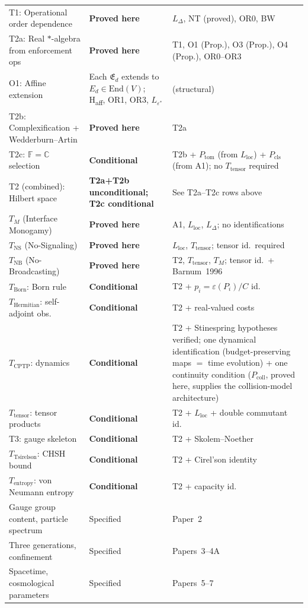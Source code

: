 \documentclass[11pt]{article}
\theoremstyle{remark}
\begin{document}
\begin{center}
\begin{tabular}{p{5.0cm}p{2.8cm}p{4.8cm}}
T1: Operational order dependence & \textbf{Proved here} & $L_\Delta$, NT (proved), OR0, BW \\
T2a: Real $*$-algebra from enforcement ops & \textbf{Proved here} & T1, O1 (Prop.), O3 (Prop.), O4 (Prop.), OR0--OR3 \\
O1: Affine extension & Each $\mathfrak{E}_d$ extends to $E_d \in \mathrm{End}(V)$; H\textsubscript{aff}, OR1, OR3, $L_{\varepsilon^*}$ & (structural) \\
T2b: Complexification + Wedderburn--Artin & \textbf{Proved here} & T2a \\
T2c: $\mathbb{F} = \mathbb{C}$ selection & \textbf{Conditional} & T2b + $P_{\mathrm{tom}}$ (from $L_{\mathrm{loc}}$) + $P_{\mathrm{cls}}$ (from A1); no $T_{\mathrm{tensor}}$ required \\
T2 (combined): Hilbert space & \textbf{T2a+T2b unconditional; T2c conditional} & See T2a--T2c rows above \\
\midrule
$T_M$ (Interface Monogamy) & \textbf{Proved here} & A1, $L_{\mathrm{loc}}$, $L_\Delta$; no identifications \\
$T_{\mathrm{NS}}$ (No-Signaling) & \textbf{Proved here} & $L_{\mathrm{loc}}$, $T_{\mathrm{tensor}}$; tensor id.\ required \\
$T_{\mathrm{NB}}$ (No-Broadcasting) & \textbf{Proved here} & T2, $T_{\mathrm{tensor}}$, $T_M$; tensor id.\ + Barnum~1996 \\
$T_{\mathrm{Born}}$: Born rule & \textbf{Conditional} & T2 + $p_i = \varepsilon(P_i)/C$ id. \\
$T_{\mathrm{Hermitian}}$: self-adjoint obs. & \textbf{Conditional} & T2 + real-valued costs \\
$T_{\mathrm{CPTP}}$: dynamics & \textbf{Conditional} & T2 + Stinespring hypotheses verified; one dynamical identification (budget-preserving maps $=$ time evolution) + one continuity condition ($P_{\mathrm{coll}}$, proved here, supplies the collision-model architecture) \\
$T_{\mathrm{tensor}}$: tensor products & \textbf{Conditional} & T2 + $L_{\mathrm{loc}}$ + double commutant id. \\
T3: gauge skeleton & \textbf{Conditional} & T2 + Skolem--Noether \\
$T_{\mathrm{Tsirelson}}$: CHSH bound & \textbf{Conditional} & T2 + Cirel'son identity \\
$T_{\mathrm{entropy}}$: von Neumann entropy & \textbf{Conditional} & T2 + capacity id. \\
\midrule
Gauge group content, particle spectrum & Specified & Paper~2 \\
Three generations, confinement & Specified & Papers~3--4A \\
Spacetime, cosmological parameters & Specified & Papers~5--7 \\
\bottomrule
\end{tabular}
\label{tab:scope}
\end{center}
\end{document}
